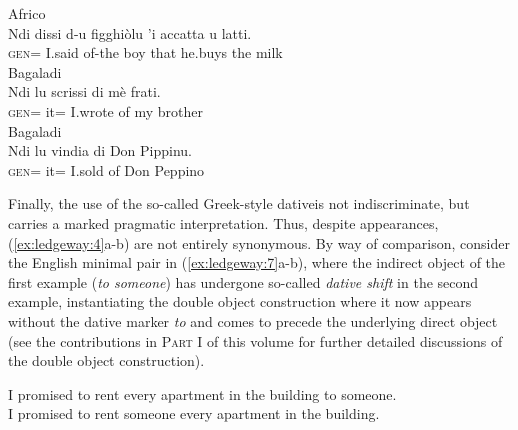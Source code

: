 \documentclass[output=paper,modfonts,nonflat]{langsci/langscibook}
\begin{document}
\ea\label{ex:ledgeway:6}
\ea Africo\\
	\gll Ndi  dissi  d-u  figghiòlu  ’i  accatta  u  latti.\\
      \textsc{gen}=  I.said  of-the  boy  that  he.buys  the  milk\\

\ex Bagaladi\\
	\gll Ndi  lu  scrissi  di  mè  frati.\\
      \textsc{gen}=  it=    I.wrote  of  my  brother\\

\ex  Bagaladi\\
	\gll Ndi  lu  vindia  di  Don  Pippinu.\\
      \textsc{gen}=  it=  I.sold  of  Don  Peppino\\
      \z
      \z
      

Finally, the use of the so-called Greek-style dativeis not indiscriminate, but carries a marked pragmatic interpretation. Thus, despite appearances, (\ref{ex:ledgeway:4}a-b) are not entirely synonymous. By way of comparison, consider the English minimal pair in (\ref{ex:ledgeway:7}a-b), where the indirect object of the first example (\textit{to someone}) has undergone so-called \textit{dative shift} in the second example, instantiating the double object construction where it now appears without the dative marker \textit{to} and comes to precede the underlying direct object (see the contributions in \textsc{Part I} of this volume for further detailed discussions of the double object construction).

\ea\label{ex:ledgeway:7}
\ea
 I promised to rent every apartment in the building to someone.\\
\ex
I promised to rent someone every apartment in the building.\\
\z
\z
\end{document}
